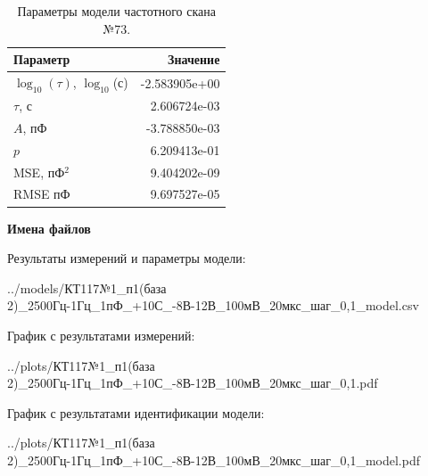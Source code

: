 \begin{table}[!ht]
    \centering
    \caption{Параметры модели частотного скана №73.}
    \begin{tabular}{|l|r|}
        \hline
        Параметр                                       & Значение                  \\ \hline
        $\log_{10}(\tau)$, $\log_{10}$(с)              & -2.583905e+00             \\ \hline
        $\tau$, с                                      & 2.606724e-03              \\ \hline
        $A$, пФ                                        & -3.788850e-03             \\ \hline
        $p$                                            & 6.209413e-01              \\ \hline
        MSE, пФ$^2$                                    & 9.404202e-09              \\ \hline
        RMSE пФ                                        & 9.697527e-05              \\ \hline
    \end{tabular}
    \label{table:frequency_scan_model_73}
\end{table}

\textbf{Имена файлов}

Результаты измерений и параметры модели:

\scriptsize../models/КТ117№1\_п1(база 2)\_2500Гц-1Гц\_1пФ\_+10С\_-8В-12В\_100мВ\_20мкс\_шаг\_0,1\_model.csv
\normalsize

График с результатами измерений:

\scriptsize../plots/КТ117№1\_п1(база 2)\_2500Гц-1Гц\_1пФ\_+10С\_-8В-12В\_100мВ\_20мкс\_шаг\_0,1.pdf
\normalsize

График с результатами идентификации модели:

\scriptsize../plots/КТ117№1\_п1(база 2)\_2500Гц-1Гц\_1пФ\_+10С\_-8В-12В\_100мВ\_20мкс\_шаг\_0,1\_model.pdf
\normalsize

